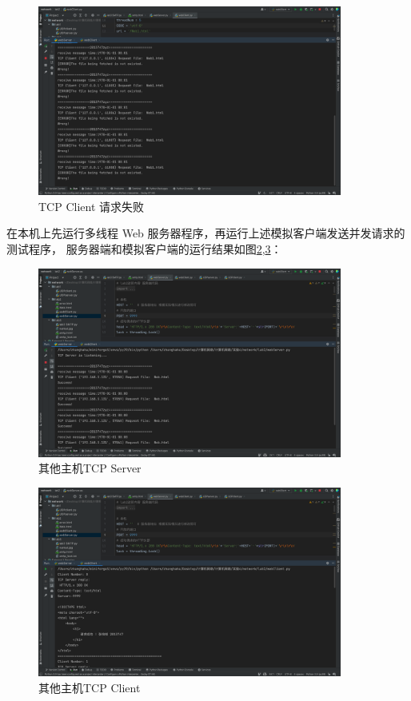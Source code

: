 \documentclass[a4paper,12pt]{report}
\begin{document}
\begin{spacing}{1.5}
\begin{figure}[H]
  \centering
\includegraphics[width=10cm]{figure/tcp_s_w.png}
\caption{TCP Client 请求失败}
\label{10}
\end{figure}

在本机上先运行多线程 Web 服务器程序，再运行上述模拟客户端发送并发请求的测试程序， 服务器端和模拟客户端的运行结果如图\ref{11},\ref{12}：
\begin{figure}[H]
  \centering
\includegraphics[width=10cm]{figure/22.png}
\caption{其他主机TCP Server}
\label{11}
\end{figure}

\begin{figure}[H]
  \centering
\includegraphics[width=10cm]{figure/11.png}
\caption{其他主机TCP Client}
\label{12}
\end{figure}


\end{spacing}
\end{document}
